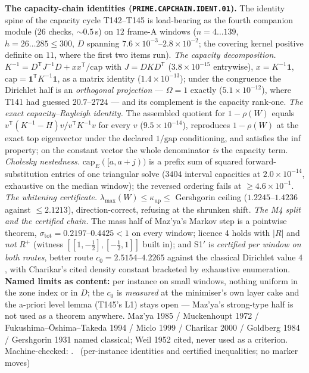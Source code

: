 \par\smallskip\noindent\textbf{The capacity-chain identities
(\texttt{PRIME.CAPCHAIN.IDENT.01}).}
The identity spine of the capacity cycle T142--T145 is load-bearing as the
fourth companion module ($26$ checks, ${\sim}0.5$\,s) on $12$ frame-A windows
($n=4\ldots139$, $h=26\ldots285\le300$, $D$ spanning
$7.6\times10^{-3}$--$2.8\times10^{-2}$; the covering kernel positive definite on
$11$, where the first two items run).
\emph{The capacity decomposition.}
$K^{-1}=D^{\mathsf T}J^{-1}D+xx^{\mathsf T}/\mathrm{cap}$ with $J=DKD^{\mathsf T}$
($3.8\times10^{-15}$ entrywise), $x=K^{-1}\mathbf 1$,
$\mathrm{cap}=\mathbf 1^{\mathsf T}K^{-1}\mathbf 1$, as a matrix identity
($1.4\times10^{-13}$); under the congruence the Dirichlet half is an
\emph{orthogonal projection} --- $\Omega=1$ exactly ($5.1\times10^{-12}$), where
T141 had guessed $20.7$--$2724$ --- and its complement is the capacity rank-one.
\emph{The exact capacity--Rayleigh identity.} The assembled quotient for
$1-\rho(W)$ equals $v^{\mathsf T}(K^{-1}-H)v/v^{\mathsf T}K^{-1}v$ for every $v$
($9.5\times10^{-14}$), reproduces $1-\rho(W)$ at the exact top eigenvector under
the declared $1/\mathrm{gap}$ conditioning, and satisfies the inf property; on
the constant vector the whole denominator \emph{is} the capacity term.
\emph{Cholesky nestedness.} $\mathrm{cap}_E([a,a{+}j))$ is a prefix sum of
squared forward-substitution entries of one triangular solve ($3404$ interval
capacities at $2.0\times10^{-14}$, exhaustive on the median window); the
reversed ordering fails at $\ge4.6\times10^{-1}$.
\emph{The whitening certificate.} $\lambda_{\max}(W)\le\kappa_{\mathrm{up}}\le$
Gershgorin ceiling ($1.2245$--$1.4236$ against $\le2.1213$), direction-correct,
refusing at the shrunken shift.
\emph{The M4 split and the certified chain.} The mass half of Maz'ya's Markov
step is a pointwise theorem, $\sigma_{\mathrm{tot}}=0.2197$--$0.4425<1$ on every
window; licence 4 holds with $|R|$ and \emph{not} $R^{+}$ (witness
$[[1,-\tfrac12],[-\tfrac12,1]]$ built in); and S1$'$ is \emph{certified per
window on both routes}, better route $c_0=2.5154$--$4.2265$ against the
classical Dirichlet value $4$, with Charikar's cited density constant bracketed
by exhaustive enumeration.
\textbf{Named limits as content:} per instance on small windows, nothing uniform
in the zone index or in $D$; the $c_0$ is \emph{measured} at the minimiser's own
layer cake and the a-priori level lemma (T145's L1) stays open --- Maz'ya's
strong-type half is not used as a theorem anywhere.
Maz'ya 1985 / Muckenhoupt 1972 / Fukushima--\=Oshima--Takeda 1994 / Miclo 1999 /
Charikar 2000 / Goldberg 1984 / Gershgorin 1931 named classical; Weil 1952
cited, never used as a criterion.
Machine-checked:
.
\mE\ (per-instance identities and certified inequalities; no marker moves)


